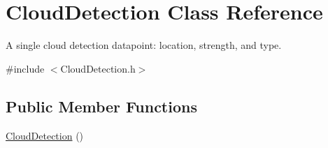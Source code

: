 \hypertarget{class_cloud_detection}{
\section{CloudDetection Class Reference}
\label{class_cloud_detection}
}


A single cloud detection datapoint: location, strength, and type.  




{\ttfamily \#include $<$CloudDetection.h$>$}

\subsection*{Public Member Functions}
\begin{DoxyCompactItemize}
\item 
\hypertarget{class_cloud_detection_a55ae8bbb53ed63efe71dea0d1fd912ea}{
\hyperlink{class_cloud_detection_a55ae8bbb53ed63efe71dea0d1fd912ea}{CloudDetection} ()}
\label{class_cloud_detection_a55ae8bbb53ed63efe71dea0d1fd912ea}


\end{DoxyCompactItemize}
